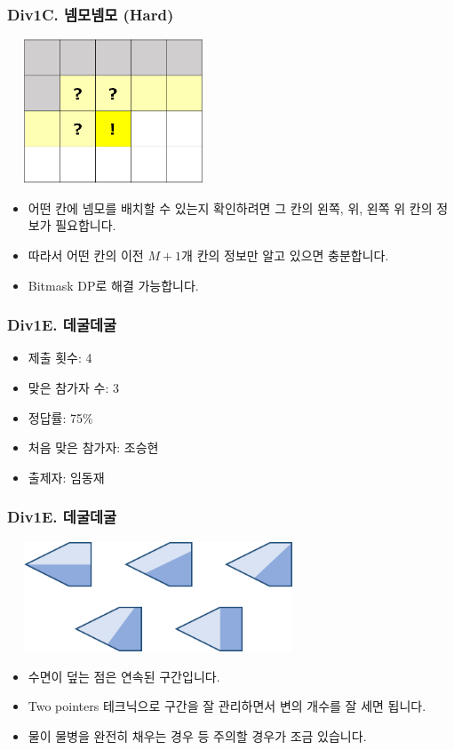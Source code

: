 \documentclass[xetex]{beamer}
\begin{document}
\begin{frame}
  \frametitle{Div1C. 넴모넴모 (Hard)}
  \begin{center}
    \includegraphics[width=0.4\textwidth]{nemo2-sol.png}
  \end{center}
  \begin{itemize}
    \item 어떤 칸에 넴모를 배치할 수 있는지 확인하려면 그 칸의 왼쪽, 위, 왼쪽 위 칸의 정보가 필요합니다.
    \item 따라서 어떤 칸의 이전 $M + 1$개 칸의 정보만 알고 있으면 충분합니다.
    \item Bitmask DP로 해결 가능합니다.
  \end{itemize}
\end{frame}

\begin{frame}
  \frametitle{Div1E. 데굴데굴}
  \begin{itemize}
    \item 제출 횟수: 4
    \item 맞은 참가자 수: 3
    \item 정답률: 75\%
    \item 처음 맞은 참가자: 조승현
    \item 출제자: 임동재
  \end{itemize}
\end{frame}

\begin{frame}
  \frametitle{Div1E. 데굴데굴}
  \begin{center}
    \includegraphics[width=0.6\textwidth]{roll-sol.png}
  \end{center}
  \begin{itemize}
    \item 수면이 덮는 점은 연속된 구간입니다.
    \item Two pointers 테크닉으로 구간을 잘 관리하면서 변의 개수를 잘 세면 됩니다.
    \item 물이 물병을 완전히 채우는 경우 등 주의할 경우가 조금 있습니다.
  \end{itemize}
\end{frame}
\end{document}

